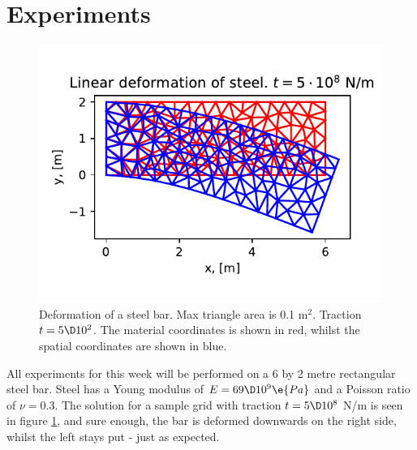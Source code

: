 \documentclass[sigconf]{acmart}
\begin{document}
\section{Experiments}
\begin{figure}
	\centering
	\includegraphics[width=\linewidth]{raw.pdf}
	\caption{Deformation of a steel bar. Max triangle area is 0.1 m$ ^2 $. Traction $ t = 5\D10^2 $. The material coordinates is shown in red, whilst the spatial coordinates are shown in blue.}
	\label{fig:raw}
\end{figure}
All experiments for this week will be performed on a 6 by 2 metre rectangular steel bar. Steel has a Young modulus of $ E = 69\D 10^9 \e{Pa} $ and a Poisson ratio of $ \nu = 0.3 $. The solution for a sample grid with traction $ t=5\D 10^8 $ N/m is seen in figure \ref{fig:raw}, and sure enough, the bar is deformed downwards on the right side, whilst the left stays put - just as expected.
\end{document}
